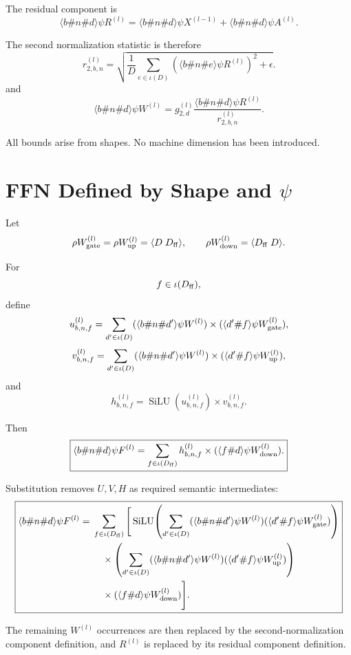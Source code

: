 \documentclass[11pt]{article}
\newcommand{\SiLU}{\operatorname{SiLU}}
\begin{document}
The residual component is
\[
\boxed{
\langle b\#n\#d\rangle\psi R^{(l)}
=
\langle b\#n\#d\rangle\psi X^{(l-1)}
+
\langle b\#n\#d\rangle\psi A^{(l)}.
}
\]

The second normalization statistic is therefore
\[
\boxed{
r^{(l)}_{2,b,n}
=
\sqrt{
\frac{1}{D}
\sum_{e\in\iota(D)}
\left(
\langle b\#n\#e\rangle\psi R^{(l)}
\right)^2+\epsilon
}.
}
\]
and
\[
\boxed{
\langle b\#n\#d\rangle\psi W^{(l)}
=
g^{(l)}_{2,d}
\frac{
\langle b\#n\#d\rangle\psi R^{(l)}
}{
r^{(l)}_{2,b,n}
}.
}
\]

All bounds arise from shapes.  No machine dimension has been introduced.

\section{FFN Defined by Shape and \(\psi\)}

Let
\[
\rho W_{\rm gate}^{(l)}
=
\rho W_{\rm up}^{(l)}
=
\langle D\;D_{\rm ff}\rangle,
\qquad
\rho W_{\rm down}^{(l)}
=
\langle D_{\rm ff}\;D\rangle.
\]

For
\[
f\in\iota(D_{\rm ff}),
\]
define
\[
u^{(l)}_{b,n,f}
=
\sum_{d'\in\iota(D)}
(\langle b\#n\#d'\rangle\psi W^{(l)})
\times
(\langle d'\#f\rangle\psi W_{\rm gate}^{(l)}),
\]
\[
v^{(l)}_{b,n,f}
=
\sum_{d'\in\iota(D)}
(\langle b\#n\#d'\rangle\psi W^{(l)})
\times
(\langle d'\#f\rangle\psi W_{\rm up}^{(l)}),
\]
and
\[
h^{(l)}_{b,n,f}
=
\SiLU(u^{(l)}_{b,n,f})
\times
v^{(l)}_{b,n,f}.
\]

Then
\[
\boxed{
\langle b\#n\#d\rangle\psi F^{(l)}
=
\sum_{f\in\iota(D_{\rm ff})}
h^{(l)}_{b,n,f}
\times
(\langle f\#d\rangle\psi W_{\rm down}^{(l)}).
}
\]

Substitution removes \(U,V,H\) as required semantic intermediates:
\[
\boxed{
\begin{aligned}
\langle b\#n\#d\rangle\psi F^{(l)}
={}&
\sum_{f\in\iota(D_{\rm ff})}
\Bigg[
\SiLU\!\left(
\sum_{d'\in\iota(D)}
(\langle b\#n\#d'\rangle\psi W^{(l)})
(\langle d'\#f\rangle\psi W_{\rm gate}^{(l)})
\right)
\\
&\quad\times
\left(
\sum_{d'\in\iota(D)}
(\langle b\#n\#d'\rangle\psi W^{(l)})
(\langle d'\#f\rangle\psi W_{\rm up}^{(l)})
\right)
\\
&\quad\times
(\langle f\#d\rangle\psi W_{\rm down}^{(l)})
\Bigg].
\end{aligned}}
\]

The remaining \(W^{(l)}\) occurrences are then replaced by the second-normalization component
definition, and \(R^{(l)}\) is replaced by its residual component definition.
\end{document}
